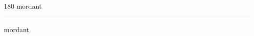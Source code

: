 
\begin{frame}
\begin{center}
\begin{turn}{180}
{\fontsize{2.5cm}{1em}\selectfont mordant}
\end{turn}
\vspace{1em}\par  
\hrule
\vspace{1em}\par  
{\fontsize{2.5cm}{1em}\selectfont mordant}
\end{center}
\end{frame}
